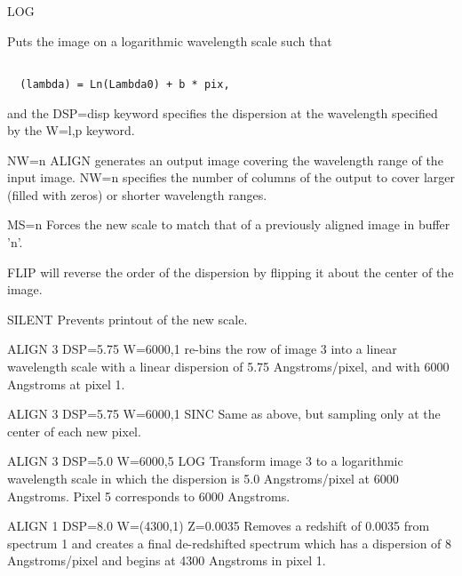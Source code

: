 {\newpage\clearpage
{}%
\begin{example} 
  \item[LOG\hfill]{Puts the image on a logarithmic wavelength scale such
       that
       \begin{verbatim}

  (lambda) = Ln(Lambda0) + b * pix,\end{verbatim}

       and the DSP=disp keyword specifies the dispersion at the wavelength
       specified by the W=l,p keyword.}
\par
\item[NW=n \hfill]{ALIGN generates an output image covering the
       wavelength range of the input image. NW=n specifies the number of
       columns of the output to cover larger (filled with zeros) or shorter
       wavelength ranges.}
\par
\item[MS=n\hfill]{Forces the new scale to match that of a previously
       aligned image in buffer 'n'.}
\par
\item[FLIP\hfill]{will reverse the order of the dispersion by flipping it
       about the center of the image.}
\par
\item[SILENT\hfill]{Prevents printout of the new scale.}
\end{example}%
\lthtmlfigureZ
\lthtmlcheckvsize\clearpage}

{\newpage\clearpage
{}%
\begin{example} 
  \item[ALIGN 3 DSP=5.75 W=6000,1\hfill]{re-bins the row of image 3 into a
       linear wavelength scale with a linear dispersion of 5.75
       Angstroms/pixel, and with 6000 Angstroms at pixel 1.}
\par
\item[ALIGN 3 DSP=5.75 W=6000,1 SINC\hfill]{Same as above, but sampling
       only at the center of each new pixel.}
\par
\item[ALIGN 3 DSP=5.0 W=6000,5 LOG\hfill]{Transform image 3 to a
       logarithmic wavelength scale in which the dispersion is 5.0
       Angstroms/pixel at 6000 Angstroms.  Pixel 5 corresponds to 6000
       Angstroms.}
\par
\item[ALIGN 1 DSP=8.0 W=(4300,1) Z=0.0035\hfill]{ Removes a redshift of
       0.0035 from spectrum 1 and creates a final de-redshifted spectrum
       which has a dispersion of 8 Angstroms/pixel and begins at 4300
       Angstroms in pixel 1.}
\end{example}%
\lthtmlfigureZ
\lthtmlcheckvsize\clearpage}

